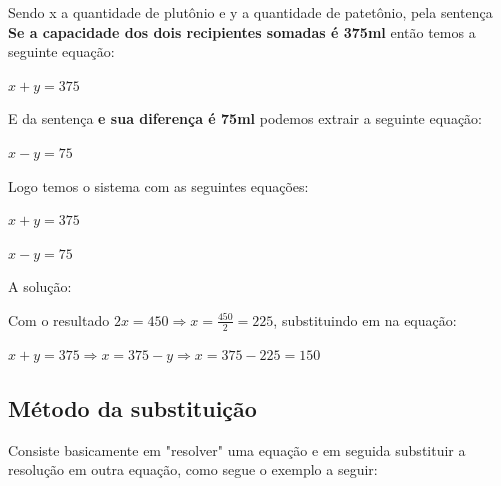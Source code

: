 \begin{multicols*}{2}
            Sendo x a quantidade de plutônio e y a quantidade de patetônio, pela sentença \textbf{ Se a 			capacidade dos dois recipientes somadas é 375ml} então temos a seguinte equação:
            
            $x + y = 375 $
            
            E da sentença \textbf{e sua diferença é 75ml} podemos extrair a seguinte equação:
            
            $x - y = 75$
            
            Logo temos o sistema com as seguintes equações:
            
            $x + y = 375 $
            
            $x - y = 75$
            
            A solução:
            
            
    
    
    
            Com o resultado $2x = 450 \Rightarrow x = \frac{450}{2} = 225$, substituindo em na equação:
            
            $x+y = 375 \Rightarrow x = 375 - y \Rightarrow x = 375 - 225 = 150$
            
            \subsection*{Método da substituição}
            Consiste basicamente em "resolver" uma equação e em seguida substituir a resolução em outra 			equação, como segue o exemplo a seguir:
            

\end{multicols*}
